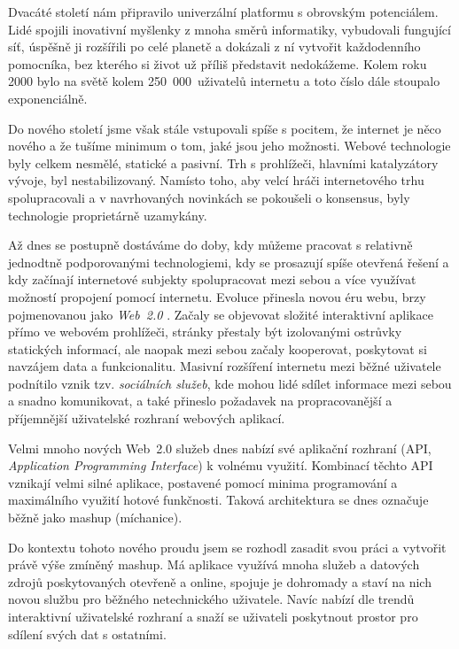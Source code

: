 Dvacáté století nám připravilo univerzální platformu s obrovským
potenciálem. Lidé spojili inovativní myšlenky z mnoha směrů informatiky,
vybudovali fungující síť, úspěšně ji rozšířili po celé planetě
a dokázali z ní vytvořit každodenního pomocníka, bez kterého si život
už příliš představit nedokážeme. Kolem roku 2000 bylo na světě kolem
250~000~uživatelů internetu a toto číslo dále stoupalo exponenciálně.

Do nového století jsme však stále vstupovali spíše s pocitem, že
internet je něco nového a že tušíme minimum o tom, jaké jsou jeho
možnosti. Webové technologie byly celkem nesmělé, statické a pasivní.
Trh s prohlížeči, hlavními katalyzátory vývoje, byl nestabilizovaný.
Namísto toho, aby velcí hráči internetového trhu spolupracovali a v
navrhovaných novinkách se pokoušeli o konsensus, byly technologie
proprietárně uzamykány.

Až dnes se postupně dostáváme do doby, kdy můžeme pracovat s
relativně jednodtně podporovanými technologiemi, kdy se prosazují
spíše otevřená řešení a kdy začínají internetové subjekty
spolupracovat mezi sebou a více využívat možností propojení pomocí
internetu. Evoluce přinesla novou éru webu, brzy pojmenovanou jako
{\it Web~2.0} \cite{web20}. Začaly se objevovat složité interaktivní
aplikace přímo ve webovém prohlížeči, stránky přestaly být izolovanými ostrůvky
statických informací, ale naopak mezi sebou začaly kooperovat,
poskytovat si navzájem data a funkcionalitu. Masivní rozšíření
internetu mezi běžné uživatele podnítilo vznik tzv. {\it sociálních
služeb}, kde mohou lidé sdílet informace mezi sebou a snadno
komunikovat, a také přineslo požadavek na propracovanější a
příjemnější uživatelské rozhraní webových aplikací.

Velmi mnoho nových Web~2.0 služeb dnes nabízí své aplikační
rozhraní (API, {\it Application Programming Interface}) k volnému
využití. Kombinací těchto API vznikají velmi silné aplikace, postavené
pomocí minima programování a maximálního využití hotové funkčnosti.
Taková architektura se dnes označuje běžně jako mashup (míchanice).

Do kontextu tohoto nového proudu jsem se rozhodl zasadit svou práci a
vytvořit právě výše zmíněný mashup. Má aplikace využívá mnoha služeb a
datových zdrojů poskytovaných otevřeně a online, spojuje je dohromady
a staví na nich novou službu pro běžného netechnického uživatele.
Navíc nabízí dle trendů interaktivní uživatelské rozhraní a snaží se
uživateli poskytnout prostor pro sdílení svých dat s ostatními.

